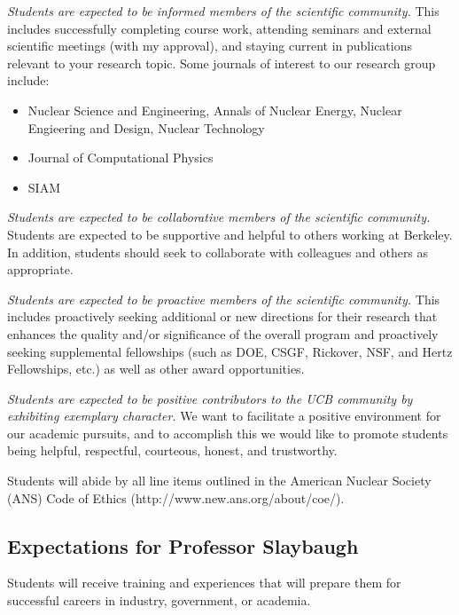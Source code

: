 \documentclass[12pt,twoside]{article}
\begin{document}
\textit{Students are expected to be informed members of the scientific community.} This includes successfully completing course work, attending seminars and external scientific meetings (with my approval), and staying current in publications relevant to your research topic. Some journals of interest to our research group include: 
%
\begin{itemize}
\item Nuclear Science and Engineering, Annals of Nuclear Energy, Nuclear Engieering and Design, Nuclear Technology
\item Journal of Computational Physics
\item SIAM
\end{itemize}

\textit{Students are expected to be collaborative members of the scientific community.} Students are expected to be supportive and helpful to others working at Berkeley. In addition, students should seek to collaborate with colleagues and others as appropriate.

\textit{Students are expected to be proactive members of the scientific community.} This includes proactively seeking additional or new directions for their research that enhances the quality and/or significance of the overall program and proactively seeking supplemental fellowships (such as DOE, CSGF, Rickover, NSF, and Hertz Fellowships, etc.) as well as other award opportunities.

\textit{Students are expected to be positive contributors to the UCB community by exhibiting exemplary character.} We want to facilitate a positive environment for our academic pursuits, and to accomplish this we would like to promote students being helpful, respectful, courteous, honest, and trustworthy. 

Students will abide by all line items outlined in the American Nuclear Society (ANS) Code of Ethics (http://www.new.ans.org/about/coe/). 


\begin{center}
\section*{Expectations for Professor Slaybaugh}
\end{center}

Students will receive training and experiences that will prepare them for successful careers in industry, government, or academia.
\end{document}

